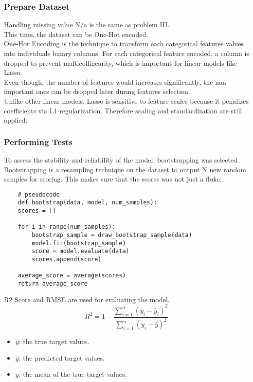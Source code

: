 \documentclass{report}
\begin{document}
\subsubsection{Prepare Dataset}
Handling missing value N/a is the same as problem III. \\

\noindent This time, the dataset can be One-Hot encoded. \\
One-Hot Encoding is the technique to transform each categorical features values into individuals
binary columns. For each categorical feature encoded, a column is dropped to prevent multicollinearity,
which is important for linear models like Lasso. \\
Even though, the number of features would increases significantly, the non important ones can 
be dropped later during features selection. \\ 
Unlike other linear models, Lasso is sensitive to feature scales because it penalizes coefficients via 
L1 regularization. Therefore scaling and standardization are still applied.  

\subsubsection{Performing Tests}
To assess the stability and reliability of the model, bootstrapping was selected. Bootstrapping is a 
resampling technique on the dataset to output N new random samples for scoring. This makes sure that 
the scores was not just a fluke. \\
\begin{verbatim}
    # pseudocode
    def bootstrap(data, model, num_samples):
    scores = []
    
    for i in range(num_samples):
        bootstrap_sample = draw_bootstrap_sample(data)
        model.fit(bootstrap_sample)
        score = model.evaluate(data)
        scores.append(score)
    
    average_score = average(scores)
    return average_score
\end{verbatim}

\noindent R2 Score and RMSE are used for evaluating the model.
\[ R^2 = 1 - \frac{\sum_{i=1}^{n} (y_i - \hat{y}_i)^2}{\sum_{i=1}^{n} (y_i - \bar{y})^2} \]
\begin{itemize}
    \item \( y \): the true target values.
    \item \( \hat{y} \): the predicted target values.
    \item \( \bar{y} \): the mean of the true target values.
\end{itemize}
\end{document}
